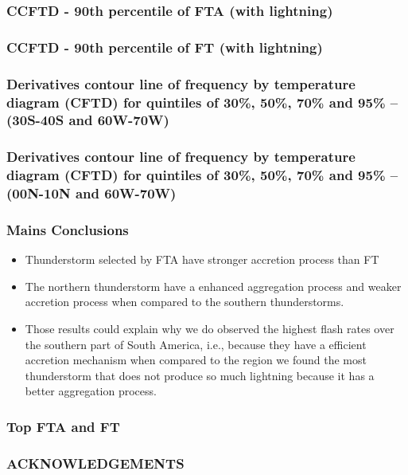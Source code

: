 \documentclass[smaller]{beamer}
\begin{document}
\begin{frame}
\frametitle{CCFTD - 90th percentile of FTA (with lightning)}

\end{frame}
\begin{frame}
\frametitle{CCFTD - 90th percentile of FT (with lightning)}

\end{frame}

\begin{frame}
\frametitle{Derivatives contour line of frequency by temperature diagram (CFTD)  for quintiles of 30\%, 50\%, 70\% and 95\% -- (30S-40S and 60W-70W)}

\end{frame}

\begin{frame}
\frametitle{Derivatives contour line of frequency by temperature diagram (CFTD)  for quintiles of 30\%, 50\%, 70\% and 95\% -- (00N-10N and 60W-70W)}

\end{frame}




\begin{frame}
\frametitle{Mains Conclusions}
\begin{itemize}
\item Thunderstorm selected by FTA have stronger accretion process than FT
\item The northern thunderstorm have a enhanced aggregation process and weaker accretion process when compared to the southern thunderstorms.
\item Those results could explain why we do observed the highest flash rates over the southern part of South America, i.e., because they have a efficient accretion mechanism when compared to the region we found the most thunderstorm that does not produce so much lightning because it has a better aggregation process.
\end{itemize}

\end{frame}

\begin{frame}
\frametitle{Top FTA and FT}

\end{frame}


\begin{frame}
\frametitle{ACKNOWLEDGEMENTS}



\end{frame}
\end{document}
